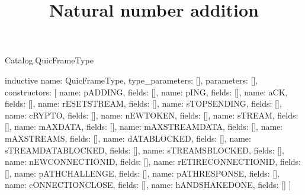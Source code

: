 \begin{lexlean}{Catalog.QuicFrameType}
\title{Natural number addition}
\begin{semanticmodule}
inductive{
  name: QuicFrameType,
  type_parameters: [],
  parameters: [],
  constructors: [
    {name: pADDING, fields: []},
    {name: pING, fields: []},
    {name: aCK, fields: []},
    {name: rESETSTREAM, fields: []},
    {name: sTOPSENDING, fields: []},
    {name: cRYPTO, fields: []},
    {name: nEWTOKEN, fields: []},
    {name: sTREAM, fields: []},
    {name: mAXDATA, fields: []},
    {name: mAXSTREAMDATA, fields: []},
    {name: mAXSTREAMS, fields: []},
    {name: dATABLOCKED, fields: []},
    {name: sTREAMDATABLOCKED, fields: []},
    {name: sTREAMSBLOCKED, fields: []},
    {name: nEWCONNECTIONID, fields: []},
    {name: rETIRECONNECTIONID, fields: []},
    {name: pATHCHALLENGE, fields: []},
    {name: pATHRESPONSE, fields: []},
    {name: cONNECTIONCLOSE, fields: []},
    {name: hANDSHAKEDONE, fields: []}
  ]
}
\end{semanticmodule}
\end{lexlean}
